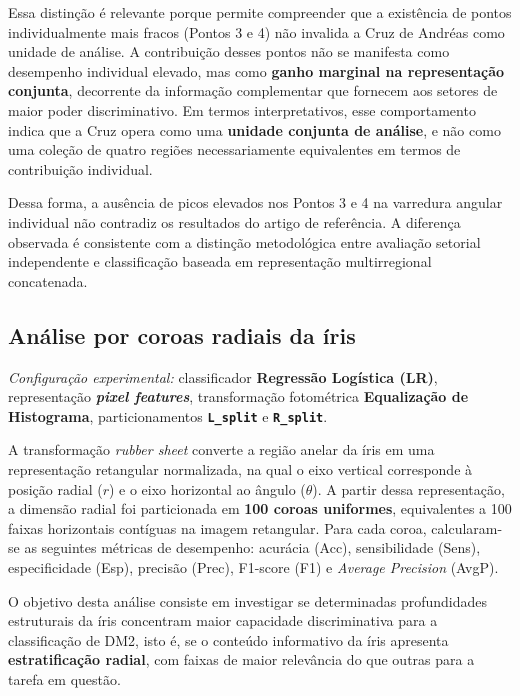 \documentclass[11pt,a4paper]{article}
\begin{document}
Essa distinção é relevante porque permite compreender que a existência de pontos individualmente mais fracos (Pontos 3 e 4) não invalida a Cruz de Andréas como unidade de análise. A contribuição desses pontos não se manifesta como desempenho individual elevado, mas como \textbf{ganho marginal na representação conjunta}, decorrente da informação complementar que fornecem aos setores de maior poder discriminativo. Em termos interpretativos, esse comportamento indica que a Cruz opera como uma \textbf{unidade conjunta de análise}, e não como uma coleção de quatro regiões necessariamente equivalentes em termos de contribuição individual.

Dessa forma, a ausência de picos elevados nos Pontos 3 e 4 na varredura angular individual não contradiz os resultados do artigo de referência. A diferença observada é consistente com a distinção metodológica entre avaliação setorial independente e classificação baseada em representação multirregional concatenada.

\subsection{Análise por coroas radiais da íris}
\label{sec:coroas-radiais}

\noindent\textit{Configuração experimental:} classificador \textbf{Regressão Logística (LR)}, representação \textbf{\textit{pixel features}}, transformação fotométrica \textbf{Equalização de Histograma}, particionamentos \textbf{\texttt{L\_split}} e \textbf{\texttt{R\_split}}.

\medskip
A transformação \textit{rubber sheet} converte a região anelar da íris em uma representação retangular normalizada, na qual o eixo vertical corresponde à posição radial (\(r\)) e o eixo horizontal ao ângulo (\(\theta\)). A partir dessa representação, a dimensão radial foi particionada em \textbf{100 coroas uniformes}, equivalentes a 100 faixas horizontais contíguas na imagem retangular. Para cada coroa, calcularam-se as seguintes métricas de desempenho: acurácia (Acc), sensibilidade (Sens), especificidade (Esp), precisão (Prec), F1-score (F1) e \textit{Average Precision} (AvgP).

O objetivo desta análise consiste em investigar se determinadas profundidades estruturais da íris concentram maior capacidade discriminativa para a classificação de DM2, isto é, se o conteúdo informativo da íris apresenta \textbf{estratificação radial}, com faixas de maior relevância do que outras para a tarefa em questão.
\end{document}
